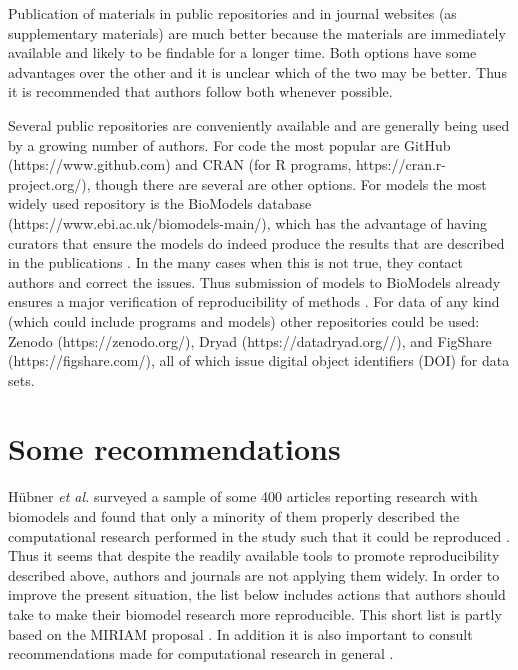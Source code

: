 Publication of materials in public repositories and in journal websites (as supplementary materials) are much better because the materials are immediately available and likely to be findable for a longer time. Both options have some advantages over the other and it is unclear which of the two may be better. Thus it is recommended that authors follow both whenever possible.

Several public repositories are conveniently available and are generally being used by a growing number of authors.  For code the most popular are GitHub (https://www.github.com) and CRAN (for R programs, https://cran.r-project.org/), though there are several are other options. For models the most widely used repository is the BioModels database  (https://www.ebi.ac.uk/biomodels-main/), which has the advantage of having curators that ensure the models do indeed produce the results that are described in the publications \cite{le_novere2006}. In the many cases when this is not true, they contact authors and correct the issues. Thus submission of models to BioModels already ensures a major verification of reproducibility of methods \cite{chelliah2015}. For data of any kind (which could include programs and models) other repositories could be used: Zenodo (https://zenodo.org/), Dryad (https://datadryad.org//), and FigShare (https://figshare.com/), all of which issue digital object identifiers (DOI) for data sets.

\section{Some recommendations}
\label{sec:recoomendations} 

H{\"u}bner {\it et al.} surveyed a sample of some 400 articles reporting research with biomodels and found that only a minority of them properly described the computational research performed in the study such that it could be reproduced \cite{hubner2011}. Thus it seems that despite the readily available   tools to promote reproducibility  described above, authors and journals  are not applying them widely. 
In order to improve the present situation, the list below includes actions that authors should take to make their biomodel research more reproducible. This short list is partly based on the MIRIAM proposal \cite{le_novere2009}. In addition it is also important to consult recommendations made for computational research in general \cite{piccolo2016,sandve2013,stodden2016}. 

